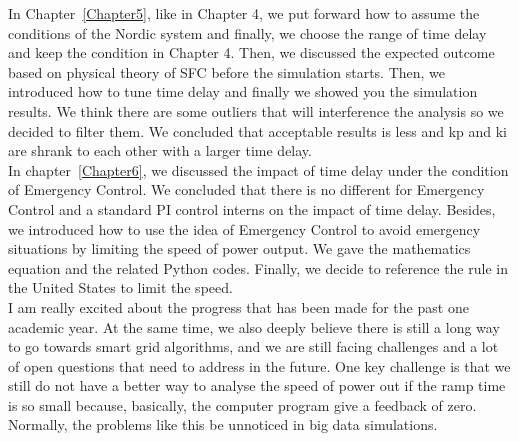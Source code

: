 In Chapter~\ref{Chapter5}, like in Chapter 4, we put forward how to assume the conditions of the Nordic system and finally, we choose the range of time delay and keep the condition in Chapter 4. Then, we discussed the expected outcome based on physical theory of SFC before the simulation starts. Then, we introduced how to tune time delay and finally we showed you the simulation results. We think there are some outliers that will interference the analysis so we decided to filter them. We concluded that acceptable results is less and kp and ki are shrank to each other with a larger time delay.\\

In chapter~\ref{Chapter6}, we discussed the impact of time delay under the condition of  Emergency Control. We concluded that there is no different for Emergency Control and a standard PI control interns on the impact of time delay. Besides, we introduced how to use the idea of Emergency Control to avoid emergency situations by limiting the speed of power output. We gave the mathematics equation and the related Python codes. Finally, we decide to reference the rule in the United States to limit the speed.\\

I am really excited about the progress that has been made for the past one academic year. At the same time, we also deeply believe there is still a long way to go towards smart grid algorithms, and we are still facing challenges and a lot of open questions that need to address in the future. One key challenge is that we still do not have a better way to analyse the speed of power out if the ramp time is so small because, basically, the computer program give a feedback of zero. Normally, the problems like this be unnoticed in big data simulations.\\
